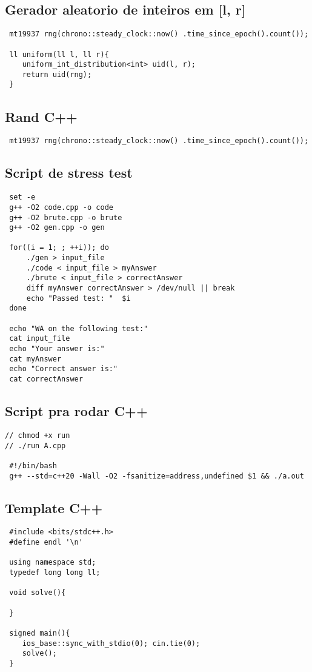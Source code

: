 \documentclass[11pt, a4paper, twoside]{article}
\begin{document}
\subsection{Gerador aleatorio de inteiros em [l, r]}
\begin{lstlisting}
 mt19937 rng(chrono::steady_clock::now() .time_since_epoch().count());
 
 ll uniform(ll l, ll r){
 	uniform_int_distribution<int> uid(l, r);
 	return uid(rng);
 }
\end{lstlisting}

\subsection{Rand C++}
\begin{lstlisting}
 mt19937 rng(chrono::steady_clock::now() .time_since_epoch().count());
\end{lstlisting}

\subsection{Script de stress test}
\begin{lstlisting}
 set -e
 g++ -O2 code.cpp -o code
 g++ -O2 brute.cpp -o brute
 g++ -O2 gen.cpp -o gen
 
 for((i = 1; ; ++i)); do
     ./gen > input_file
     ./code < input_file > myAnswer
     ./brute < input_file > correctAnswer
     diff myAnswer correctAnswer > /dev/null || break
     echo "Passed test: "  $i
 done
 
 echo "WA on the following test:"
 cat input_file
 echo "Your answer is:"
 cat myAnswer
 echo "Correct answer is:"
 cat correctAnswer
\end{lstlisting}

\subsection{Script pra rodar C++}
\begin{lstlisting}
// chmod +x run
// ./run A.cpp

 #!/bin/bash
 g++ --std=c++20 -Wall -O2 -fsanitize=address,undefined $1 && ./a.out
\end{lstlisting}

\subsection{Template C++}
\begin{lstlisting}
 #include <bits/stdc++.h>
 #define endl '\n'
 
 using namespace std;
 typedef long long ll;
 
 void solve(){
 
 }
 
 signed main(){
 	ios_base::sync_with_stdio(0); cin.tie(0);
 	solve();
 }
\end{lstlisting}
\end{document}
